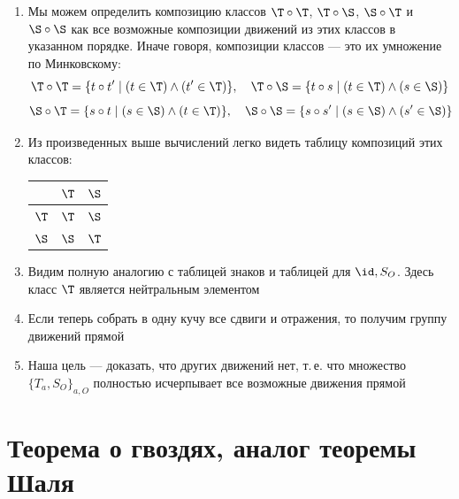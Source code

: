 \begin{enumerate}
\item Мы можем определить композицию классов $\T\circ \T$, $\T\circ \S$, $\S\circ \T$ и $\S\circ \S$ как все возможные композиции движений из этих классов в указанном порядке. Иначе говоря, композиции классов --- это их умножение по Минковскому:
$$
\T\circ \T = \{t\circ t'\mid (t\in\T)\land(t'\in\T)\},\quad \T\circ \S = \{t\circ s\mid (t\in\T)\land(s\in\S)\}
$$
$$
\S\circ \T = \{s\circ t\mid (s\in\S)\land(t\in\T)\},\quad \S\circ \S = \{s\circ s'\mid (s\in\S)\land(s'\in\S)\}
$$
\item Из произведенных выше вычислений легко видеть таблицу композиций этих классов:
\begin{center}
\begin{tabular}{c|c|c|}
  & $\T$ & $\S$ \\
 \hline
$\T$ & $\T$ & $\S$ \\
 \hline
$\S$ & $\S$ & $\T$ \\
\hline
\end{tabular}
\end{center}
\item Видим полную аналогию с таблицей знаков и таблицей для $\id, S_O$. Здесь класс $\T$ является нейтральным элементом
\item Если теперь собрать в одну кучу все сдвиги и отражения, то получим группу движений прямой
\item Наша цель --- доказать, что других движений нет, т.\,е. что множество $\{T_a,S_O\}_{a,O}$ полностью исчерпывает все возможные движения прямой
\end{enumerate}



\section{Теорема о гвоздях, аналог теоремы Шаля}\label{Schal-1}




